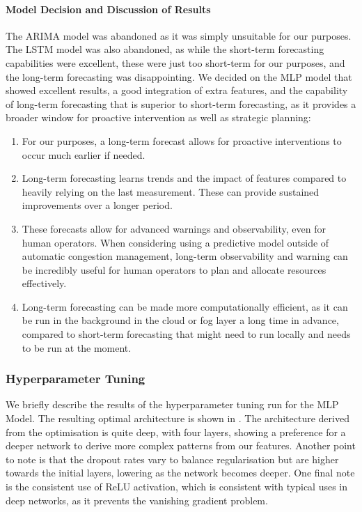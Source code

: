 \paragraph{Model Decision and Discussion of Results}
\label{link:model-decision}
The ARIMA model was abandoned as it was simply unsuitable for our purposes. The LSTM model was also abandoned, as while the short-term forecasting capabilities were excellent, these were just too short-term for our purposes, and the long-term forecasting was disappointing. We decided on the MLP model that showed excellent results, a good integration of extra features, and the capability of long-term forecasting that is superior to short-term forecasting, as it provides a broader window for proactive intervention as well as strategic planning:
\begin{enumerate}
    \item For our purposes, a long-term forecast allows for proactive interventions to occur much earlier if needed.
    \item Long-term forecasting learns trends and the impact of features compared to heavily relying on the last measurement. These can provide sustained improvements over a longer period.
    \item These forecasts allow for advanced warnings and observability, even for human operators. When considering using a predictive model outside of automatic congestion management, long-term observability and warning can be incredibly useful for human operators to plan and allocate resources effectively.
    \item Long-term forecasting can be made more computationally efficient, as it can be run in the background in the cloud or fog layer a long time in advance, compared to short-term forecasting that might need to run locally and needs to be run at the moment.
\end{enumerate}

\subsubsection{Hyperparameter Tuning}
We briefly describe the results of the hyperparameter tuning run for the MLP Model. The resulting optimal architecture is shown in . The architecture derived from the optimisation is quite deep, with four layers, showing a preference for a deeper network to derive more complex patterns from our features. Another point to note is that the dropout rates vary to balance regularisation but are higher towards the initial layers, lowering as the network becomes deeper. One final note is the consistent use of ReLU activation, which is consistent with typical uses in deep networks, as it prevents the vanishing gradient problem.

